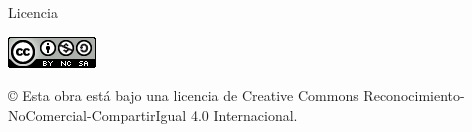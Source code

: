 \newpage
\thispagestyle{empty}

\bigskip
\begin{LARGE}
Licencia
\end{LARGE}





\begin{center}
\includegraphics[scale=1.8]{figures/by-nc-sa_88x31}\\[5mm]
\end{center}

\begin{large}
© Esta obra está bajo una licencia de Creative Commons Reconocimiento-NoComercial-CompartirIgual 4.0 Internacional.
\end{large}

\bigskip
\bigskip
\bigskip




